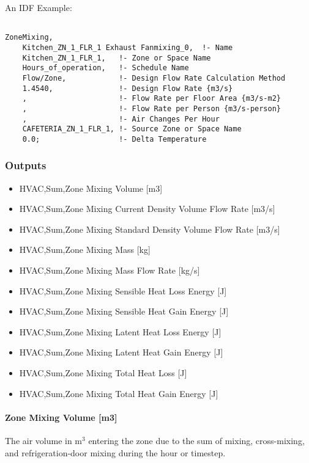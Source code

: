 An IDF Example:

\begin{lstlisting}

ZoneMixing,
    Kitchen_ZN_1_FLR_1 Exhaust Fanmixing_0,  !- Name
    Kitchen_ZN_1_FLR_1,   !- Zone or Space Name
    Hours_of_operation,   !- Schedule Name
    Flow/Zone,            !- Design Flow Rate Calculation Method
    1.4540,               !- Design Flow Rate {m3/s}
    ,                     !- Flow Rate per Floor Area {m3/s-m2}
    ,                     !- Flow Rate per Person {m3/s-person}
    ,                     !- Air Changes Per Hour
    CAFETERIA_ZN_1_FLR_1, !- Source Zone or Space Name
    0.0;                  !- Delta Temperature
\end{lstlisting}

\subsubsection{Outputs}\label{outputs-3-000}

\begin{itemize}
\item
  HVAC,Sum,Zone Mixing Volume {[}m3{]}
\item
  HVAC,Sum,Zone Mixing Current Density Volume Flow Rate {[}m3/s{]}
\item
  HVAC,Sum,Zone Mixing Standard Density Volume Flow Rate {[}m3/s{]}
\item
  HVAC,Sum,Zone Mixing Mass {[}kg{]}
\item
  HVAC,Sum,Zone Mixing Mass Flow Rate {[}kg/s{]}
\item
  HVAC,Sum,Zone Mixing Sensible Heat Loss Energy {[}J{]}
\item
  HVAC,Sum,Zone Mixing Sensible Heat Gain Energy {[}J{]}
\item
  HVAC,Sum,Zone Mixing Latent Heat Loss Energy {[}J{]}
\item
  HVAC,Sum,Zone Mixing Latent Heat Gain Energy {[}J{]}
\item
  HVAC,Sum,Zone Mixing Total Heat Loss {[}J{]}
\item
  HVAC,Sum,Zone Mixing Total Heat Gain Energy {[}J{]}
\end{itemize}

\paragraph{Zone Mixing Volume {[}m3{]}}\label{zone-mixing-volume-m3}

The air volume in m\(^{3}\) entering the zone due to the sum of mixing, cross-mixing, and refrigeration-door mixing during the hour or timestep.

